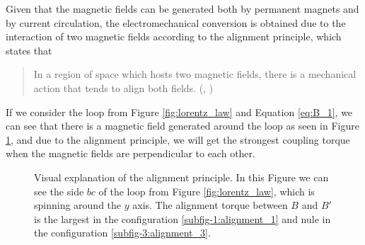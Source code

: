 \begin{description}
Given that the magnetic fields can be generated both by permanent magnets and by current circulation, the electromechanical conversion is obtained due to the interaction of two magnetic fields according to the alignment principle, which states that
\blockquote{In a region of space which hosts two magnetic fields, there is a mechanical action that tends to align both fields. (\citeauthor{sistemi_di_controllo:2007}, \citeyear{sistemi_di_controllo:2007})}

If we consider the loop from Figure \ref{fig:lorentz_law} and Equation \ref{eq:B_1}, we can see that there is a magnetic field generated around the loop as seen in Figure \ref{fig:alignment}, and due to the alignment principle, we will get the strongest coupling torque when the magnetic fields are perpendicular to each other.

\begin{figure}[htbp]
	\centering
    \hfill
    \hfill
    \caption{Visual explanation of the alignment principle. In this Figure we can see the side $bc$ of the loop from Figure \ref{fig:lorentz_law}, which is spinning around the $y$ axis. The alignment torque between $B$ and $B'$ is the largest in the configuration \ref{subfig-1:alignment_1} and nule in the configuration \ref{subfig-3:alignment_3}.}
    \label{fig:alignment}
\end{figure}


\end{description}

